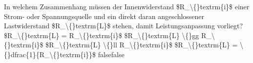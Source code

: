     {In welchem Zusammenhang müssen der Innenwiderstand \$R\_\textbackslash\{\}textrm\{i\}\$ einer Strom- oder Spannungsquelle und ein direkt daran angeschlossener Lastwiderstand \$R\_\textbackslash\{\}textrm\{L\}\$ stehen, damit Leistungsanpassung vorliegt?}
    {\$R\_\textbackslash\{\}textrm\{L\} = R\_\textbackslash\{\}textrm\{i\}\$}
    {\$R\_\textbackslash\{\}textrm\{L\} \textbackslash\{\}gg R\_\textbackslash\{\}textrm\{i\}\$}
    {\$R\_\textbackslash\{\}textrm\{L\} \textbackslash\{\}ll R\_\textbackslash\{\}textrm\{i\}\$}
    {\$R\_\textbackslash\{\}textrm\{L\} = \textbackslash\{\}dfrac\{1\}\{R\_\textbackslash\{\}textrm\{i\}\}\$}
    {false}{false}